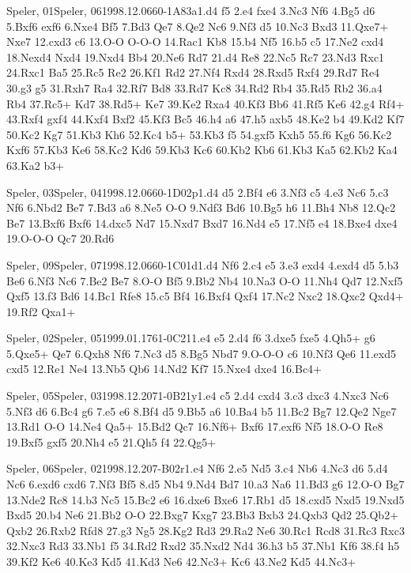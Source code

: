\documentclass[twocolumn,a4paper,10pt]{report}
\begin{document}
\begin{chessgame}{Speler, 01}{Speler, 06}{1998.12.06}{6}{0-1}{A83a}{1.d4 f5 2.e4 fxe4 3.Nc3 Nf6 4.Bg5 d6 5.Bxf6 exf6 6.Nxe4 Bf5 7.Bd3 Qe7 8.Qe2 Nc6 9.Nf3 d5 10.Nc3 Bxd3 11.Qxe7+ Nxe7 12.cxd3 c6 13.O-O O-O-O 14.Rac1 Kb8 15.b4 Nf5 16.b5 c5 17.Ne2 cxd4 18.Nexd4 Nxd4 19.Nxd4 Bb4 20.Ne6 Rd7 21.d4 Re8 22.Nc5 Rc7 23.Nd3 Rxc1 24.Rxc1 Ba5 25.Rc5 Re2 26.Kf1 Rd2 27.Nf4 Rxd4 28.Rxd5 Rxf4 29.Rd7 Re4 30.g3 g5 31.Rxh7 Ra4 32.Rf7 Bd8 33.Rd7 Kc8 34.Rd2 Rb4 35.Rd5 Rb2 36.a4 Rb4 37.Rc5+ Kd7 38.Rd5+ Ke7 39.Ke2 Rxa4 40.Kf3 Bb6 41.Rf5 Ke6 42.g4 Rf4+ 43.Rxf4 gxf4 44.Kxf4 Bxf2 45.Kf3 Bc5 46.h4 a6 47.h5 axb5 48.Ke2 b4 49.Kd2 Kf7 50.Kc2 Kg7 51.Kb3 Kh6 52.Kc4 b5+ 53.Kb3 f5 54.gxf5 Kxh5 55.f6 Kg6 56.Kc2 Kxf6 57.Kb3 Ke6 58.Kc2 Kd6 59.Kb3 Kc6 60.Kb2 Kb6 61.Kb3 Ka5 62.Kb2 Ka4 63.Ka2 b3+}\end{chessgame}
\begin{chessgame}{Speler, 03}{Speler, 04}{1998.12.06}{6}{0-1}{D02p}{1.d4 d5 2.Bf4 e6 3.Nf3 c5 4.e3 Nc6 5.c3 Nf6 6.Nbd2 Be7 7.Bd3 a6 8.Ne5 O-O 9.Ndf3 Bd6 10.Bg5 h6 11.Bh4 Nb8 12.Qc2 Be7 13.Bxf6 Bxf6 14.dxc5 Nd7 15.Nxd7 Bxd7 16.Nd4 e5 17.Nf5 e4 18.Bxe4 dxe4 19.O-O-O Qc7 20.Rd6}\end{chessgame}
\begin{chessgame}{Speler, 09}{Speler, 07}{1998.12.06}{6}{0-1}{C01d}{1.d4 Nf6 2.c4 e5 3.e3 exd4 4.exd4 d5 5.b3 Be6 6.Nf3 Nc6 7.Be2 Be7 8.O-O Bf5 9.Bb2 Nb4 10.Na3 O-O 11.Nh4 Qd7 12.Nxf5 Qxf5 13.f3 Bd6 14.Bc1 Rfe8 15.c5 Bf4 16.Bxf4 Qxf4 17.Nc2 Nxc2 18.Qxc2 Qxd4+ 19.Rf2 Qxa1+}\end{chessgame}
\begin{chessgame}{Speler, 02}{Speler, 05}{1999.01.17}{6}{1-0}{C21}{1.e4 e5 2.d4 f6 3.dxe5 fxe5 4.Qh5+ g6 5.Qxe5+ Qe7 6.Qxh8 Nf6 7.Nc3 d5 8.Bg5 Nbd7 9.O-O-O c6 10.Nf3 Qe6 11.exd5 cxd5 12.Re1 Ne4 13.Nb5 Qb6 14.Nd2 Kf7 15.Nxe4 dxe4 16.Bc4+}\end{chessgame}
\begin{chessgame}{Speler, 05}{Speler, 03}{1998.12.20}{7}{1-0}{B21y}{1.e4 c5 2.d4 cxd4 3.c3 dxc3 4.Nxc3 Nc6 5.Nf3 d6 6.Bc4 g6 7.e5 e6 8.Bf4 d5 9.Bb5 a6 10.Ba4 b5 11.Bc2 Bg7 12.Qe2 Nge7 13.Rd1 O-O 14.Ne4 Qa5+ 15.Bd2 Qc7 16.Nf6+ Bxf6 17.exf6 Nf5 18.O-O Re8 19.Bxf5 gxf5 20.Nh4 e5 21.Qh5 f4 22.Qg5+}\end{chessgame}
\begin{chessgame}{Speler, 06}{Speler, 02}{1998.12.20}{7}{\textonehalf-\textonehalf}{B02r}{1.e4 Nf6 2.e5 Nd5 3.c4 Nb6 4.Nc3 d6 5.d4 Nc6 6.exd6 cxd6 7.Nf3 Bf5 8.d5 Nb4 9.Nd4 Bd7 10.a3 Na6 11.Bd3 g6 12.O-O Bg7 13.Nde2 Rc8 14.b3 Nc5 15.Bc2 e6 16.dxe6 Bxe6 17.Rb1 d5 18.cxd5 Nxd5 19.Nxd5 Bxd5 20.b4 Ne6 21.Bb2 O-O 22.Bxg7 Kxg7 23.Bb3 Bxb3 24.Qxb3 Qd2 25.Qb2+ Qxb2 26.Rxb2 Rfd8 27.g3 Ng5 28.Kg2 Rd3 29.Ra2 Ne6 30.Rc1 Rcd8 31.Rc3 Rxc3 32.Nxc3 Rd3 33.Nb1 f5 34.Rd2 Rxd2 35.Nxd2 Nd4 36.h3 b5 37.Nb1 Kf6 38.f4 h5 39.Kf2 Ke6 40.Ke3 Kd5 41.Kd3 Ne6 42.Nc3+ Kc6 43.Ne2 Kd5 44.Nc3+}\end{chessgame}
\end{document}
